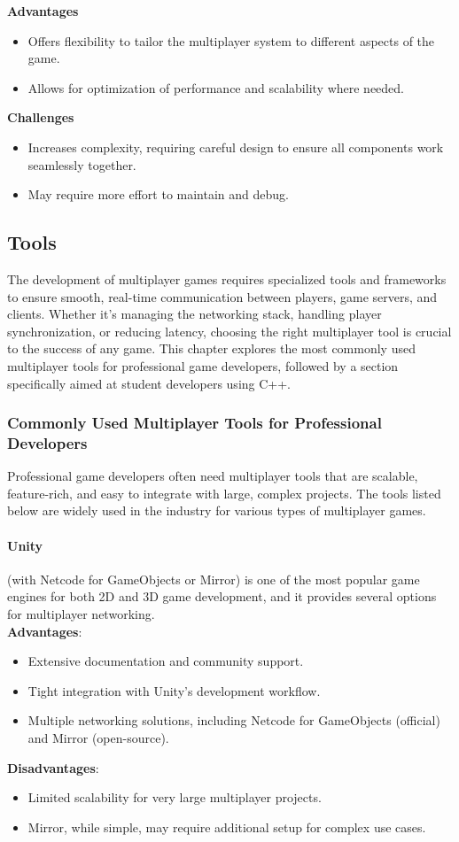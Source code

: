 \documentclass{article} %
\begin{document}
\textbf{Advantages}
\begin{itemize}
    \item Offers flexibility to tailor the multiplayer system to different aspects of the game.
    \item Allows for optimization of performance and scalability where needed.
\end{itemize}

\textbf{Challenges}
\begin{itemize}
    \item Increases complexity, requiring careful design to ensure all components work seamlessly together.
    \item May require more effort to maintain and debug.
\end{itemize}

\subsection{Tools}
The development of multiplayer games requires specialized tools and frameworks to ensure smooth,
real-time communication between players, game servers, and clients. Whether it's managing the networking stack, handling player synchronization, or reducing latency,
choosing the right multiplayer tool is crucial to the success of any game. This chapter explores the most commonly used multiplayer tools for professional game developers,
followed by a section specifically aimed at student developers using C++.

\subsubsection{Commonly Used Multiplayer Tools for Professional Developers}
Professional game developers often need multiplayer tools that are scalable, feature-rich, and easy to integrate with large, complex projects. The tools listed below are widely used in the industry for various types of multiplayer games.

\paragraph{Unity} (with Netcode for GameObjects or Mirror)
is one of the most popular game engines for both 2D and 3D game development,
and it provides several options for multiplayer networking.
\\
\textbf{Advantages}:
\begin{itemize}
    \item Extensive documentation and community support.
    \item Tight integration with Unity's development workflow.
    \item Multiple networking solutions, including Netcode for GameObjects (official) and Mirror (open-source).
\end{itemize}
\textbf{Disadvantages}:
\begin{itemize}
    \item Limited scalability for very large multiplayer projects.
    \item Mirror, while simple, may require additional setup for complex use cases.
\end{itemize}
\end{document}
